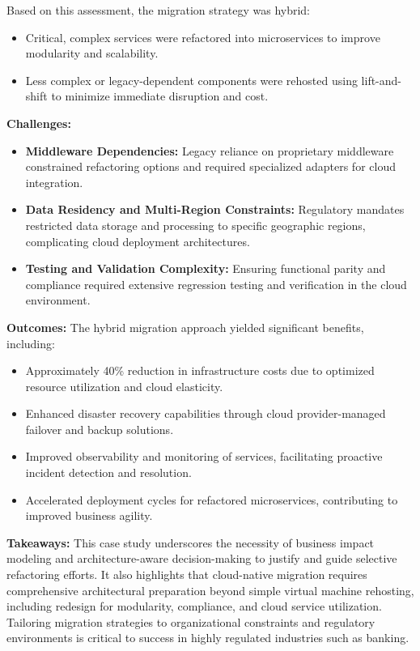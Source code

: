 \documentclass[12pt]{article}
\begin{document}
Based on this assessment, the migration strategy was hybrid:  
\begin{itemize}
    \item Critical, complex services were refactored into microservices to improve modularity and scalability.
    \item Less complex or legacy-dependent components were rehosted using lift-and-shift to minimize immediate disruption and cost.
\end{itemize}

\textbf{Challenges:}  
\begin{itemize}
    \item \textbf{Middleware Dependencies:} Legacy reliance on proprietary middleware constrained refactoring options and required specialized adapters for cloud integration.
    \item \textbf{Data Residency and Multi-Region Constraints:} Regulatory mandates restricted data storage and processing to specific geographic regions, complicating cloud deployment architectures.
    \item \textbf{Testing and Validation Complexity:} Ensuring functional parity and compliance required extensive regression testing and verification in the cloud environment.
\end{itemize}

\textbf{Outcomes:}  
The hybrid migration approach yielded significant benefits, including:

\begin{itemize}
    \item Approximately 40\% reduction in infrastructure costs due to optimized resource utilization and cloud elasticity.
    \item Enhanced disaster recovery capabilities through cloud provider-managed failover and backup solutions.
    \item Improved observability and monitoring of services, facilitating proactive incident detection and resolution.
    \item Accelerated deployment cycles for refactored microservices, contributing to improved business agility.
\end{itemize}

\textbf{Takeaways:}  
This case study underscores the necessity of business impact modeling and architecture-aware decision-making to justify and guide selective refactoring efforts. It also highlights that cloud-native migration requires comprehensive architectural preparation beyond simple virtual machine rehosting, including redesign for modularity, compliance, and cloud service utilization. Tailoring migration strategies to organizational constraints and regulatory environments is critical to success in highly regulated industries such as banking.
\end{document}
